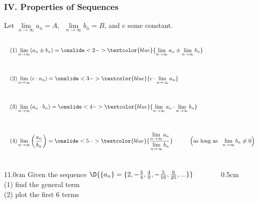 \begin{frame}
\frametitle{IV. Properties of Sequences}
\scriptsize

Let $\lim \limits_{n \to \infty} a_n = A$, $\,\,\lim \limits_{n \to \infty} b_n = B$, and c some constant.

\begin{align*}
&\\
\quad &(1) \lim \limits_{n \to \infty} (a_n \pm b_n) = \onslide<2->{\textcolor{blue}{\lim \limits_{n \to \infty} a_n \pm \lim \limits_{n \to \infty} b_n}}  \\
&\\
&\\
\quad &(2) \lim \limits_{n \to \infty} (c \cdot a_n) = \onslide<3->{\textcolor{blue}{c \cdot \lim \limits_{n \to \infty} a_n}} \\
&\\
&\\
\quad &(3) \lim \limits_{n \to \infty} (a_n \cdot b_n) = \onslide<4->{\textcolor{blue}{\lim \limits_{n \to \infty} a_n \cdot \lim \limits_{n \to \infty} b_n}} \\
&\\
&\\
\quad &(4) \lim \limits_{n \to \infty} \left(\frac{a_n}{b_n}\right) = \onslide<5->{\textcolor{blue}{\frac{\lim \limits_{n \to \infty} a_n}{\lim \limits_{n \to \infty} b_n}}} \hspace{1.0cm} \left(\text{as long as } \,\, \lim \limits_{n \to \infty} b_n \ne 0\right)
\end{align*}

\vspace{0.5cm}


\end{frame}

\begin{frame}
\frametitle{}
\scriptsize

\vspace{0.2cm}

\begin{columns}
\begin{column}{11.0cm}
Given the sequence $\D{\{a_n\} = \{ 2, -\frac{3}{4}, \frac{4}{9}, -\frac{5}{16},\frac{6}{25}, ...\}}$\\
\vspace{0.2cm}
(1) find the general term \\
\vspace{0.2cm}
(2) plot the first 6 terms \\ 

\vspace{10.5cm}

\end{column}
\begin{column}{0.5cm}
	
\end{column}
\end{columns}
\end{frame}

